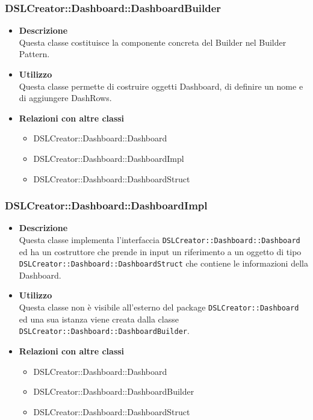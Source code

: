                 \subsubsection{DSLCreator::Dashboard::DashboardBuilder}
                    \begin{itemize}
                        \item \textbf{Descrizione} \hfill \\
                            Questa classe costituisce la componente concreta del Builder nel Builder Pattern.
                        \item \textbf{Utilizzo} \hfill \\
                            Questa classe permette di costruire oggetti Dashboard, di definire un nome e di aggiungere DashRows.
                        \item \textbf{Relazioni con altre classi}
                            \begin{itemize}
                              \item DSLCreator::Dashboard::Dashboard
                              \item DSLCreator::Dashboard::DashboardImpl
                              \item DSLCreator::Dashboard::DashboardStruct
                            \end{itemize}
                    \end{itemize}

                \subsubsection{DSLCreator::Dashboard::DashboardImpl}
                    \begin{itemize}
                        \item \textbf{Descrizione} \hfill \\
                            Questa classe implementa l'interfaccia \texttt{DSLCreator::Dashboard::Dashboard} ed ha un costruttore che prende in input un riferimento a un oggetto di tipo \\ \texttt{DSLCreator::Dashboard::DashboardStruct} che contiene le informazioni della Dashboard.
                        \item \textbf{Utilizzo} \hfill \\
                            Questa classe non è visibile all'esterno del package \texttt{DSLCreator::Dashboard} ed una sua istanza viene creata dalla classe \texttt{DSLCreator::Dashboard::DashboardBuilder}.
                        \item \textbf{Relazioni con altre classi}
                            \begin{itemize}
                              \item DSLCreator::Dashboard::Dashboard
                              \item DSLCreator::Dashboard::DashboardBuilder
                              \item DSLCreator::Dashboard::DashboardStruct
                            \end{itemize}
                    \end{itemize}


